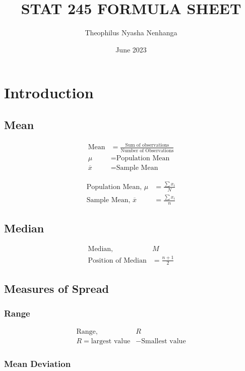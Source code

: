 \documentclass{article}
\title{STAT 245 FORMULA SHEET}
\author{Theophilus Nyasha Nenhanga}
\date{June 2023}
\begin{document}
\maketitle

\section{Introduction}

\subsection{Mean}

\begin{align*}
    \text{Mean} &= \frac{\text{Sum of observations}}{\text{Number of Observations}}\\[12pt]
    \mu &= \text{Population Mean}\\
    \overline{x} &= \text{Sample Mean}
\end{align*}

\begin{align*}
    \text{Population Mean, } \mu &= \frac{\sum x_{i}}{N}\\
    \text{Sample Mean, } \overline{x} &= \frac{\sum x_{i}}{n}
\end{align*}

\subsection{Median}
\begin{align*}
    \text{Median, } &M\\
    \text{Position of Median} &= \frac{n+1}{2}
\end{align*}

\subsection{Measures of Spread}

\subsubsection{Range}

\begin{align*}
    \text{Range, } &R\\
    R = \text{largest value} &- \text{Smallest value}
\end{align*}

\subsubsection{Mean Deviation}
\end{document}
